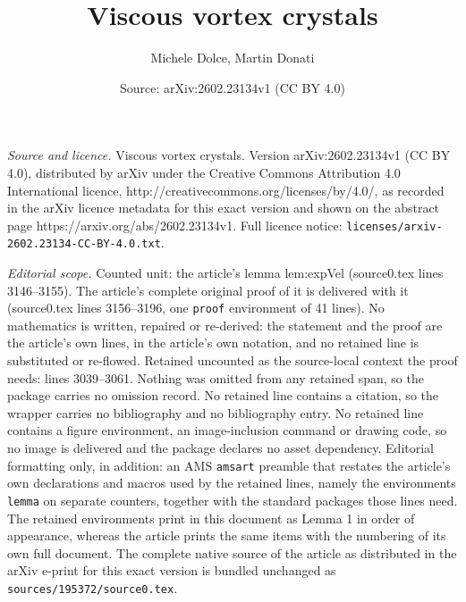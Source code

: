 \documentclass[10pt,a4paper]{amsart}
\title{Viscous vortex crystals}
\author{Michele Dolce, Martin Donati}
\date{Source: arXiv:2602.23134v1 (CC BY 4.0)}
\begin{document}
\maketitle

\noindent\emph{Source and licence.} Viscous vortex crystals. Version arXiv:2602.23134v1 (CC BY 4.0), distributed by arXiv under the Creative Commons Attribution 4.0 International licence, http://creativecommons.org/licenses/by/4.0/, as recorded in the arXiv licence metadata for this exact version and shown on the abstract page https://arxiv.org/abs/2602.23134v1. Full licence notice: \texttt{licenses/arxiv-2602.23134-CC-BY-4.0.txt}.\par\smallskip

\noindent\textit{Editorial scope.} Counted unit: the article's lemma lem:expVel (source0.tex lines 3146--3155). The article's complete original proof of it is delivered with it (source0.tex lines 3156--3196, one \texttt{proof} environment of 41 lines). No mathematics is written, repaired or re-derived: the statement and the proof are the article's own lines, in the article's own notation, and no retained line is substituted or re-flowed.  Retained uncounted as the source-local context the proof needs: lines 3039--3061.  Nothing was omitted from any retained span, so the package carries no omission record.  No retained line contains a citation, so the wrapper carries no bibliography and no bibliography entry.  No retained line contains a figure environment, an image-inclusion command or drawing code, so no image is delivered and the package declares no asset dependency.  Editorial formatting only, in addition: an AMS \texttt{amsart} preamble that restates the article's own declarations and macros used by the retained lines, namely the environments \texttt{lemma} on separate counters, together with the standard packages those lines need.  The retained environments print in this document as Lemma 1 in order of appearance, whereas the article prints the same items with the numbering of its own full document.  The complete native source of the article as distributed in the arXiv e-print for this exact version is bundled unchanged as \texttt{sources/195372/source0.tex}.
\end{document}
